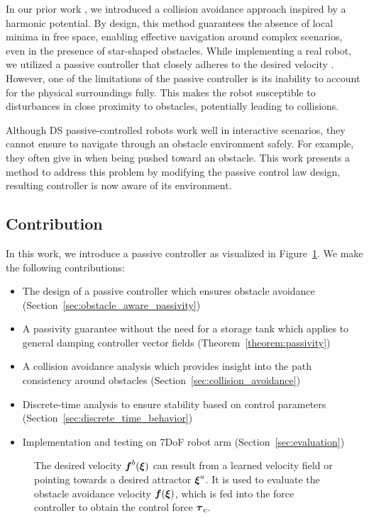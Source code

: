 In our prior work \cite{huber2019avoidance, huber2023avoidance}, we introduced a collision avoidance approach inspired by a harmonic potential. By design, this method guarantees the absence of local minima in free space, enabling effective navigation around complex scenarios, even in the presence of star-shaped obstacles.
While implementing a real robot, we utilized a passive controller that closely adheres to the desired velocity \cite{kronander2015passive}. However, one of the limitations of the passive controller is its inability to account for the physical surroundings fully. This makes the robot susceptible to disturbances in close proximity to obstacles, potentially leading to collisions.

Although DS passive-controlled robots work well in interactive scenarios, they cannot ensure to navigate through an obstacle environment safely. For example, they often give in when being pushed toward an obstacle. This work presents a method to address this problem by modifying the passive control law design, resulting controller is now aware of its environment.

\subsection{Contribution}
In this work, we introduce a passive controller as visualized in Figure~\ref{fig:control_scheme_passive}. We make the following contributions:

\begin{itemize}
\item The design of a passive controller which ensures obstacle avoidance (Section~\ref{sec:obstacle_aware_passivity})
\item A passivity guarantee without the need for a storage tank which applies to general damping controller vector fields (Theorem~\ref{theorem:passivity})
\item A collision avoidance analysis which provides insight into the path consistency around obstacles (Section~\ref{sec:collision_avoidance})
\item Discrete-time analysis to ensure stability based on control parameters (Section~\ref{sec:discrete_time_behavior})
\item Implementation and testing on 7DoF robot arm (Section~\ref{sec:evaluation})
\end{itemize}

\begin{figure}[thb]
  \center
  
\caption{The desired velocity $\boldsymbol{f}^b(\boldsymbol{\xi})$ can result from a learned velocity field or pointing towards a desired attractor $\boldsymbol{\xi}^a$. It is used to evaluate the obstacle avoidance velocity $\boldsymbol{f}(\boldsymbol{\xi})$, which is fed into the force controller to obtain the control force $\boldsymbol{\tau}_c$.}
\label{fig:control_scheme_passive}
\end{figure}
